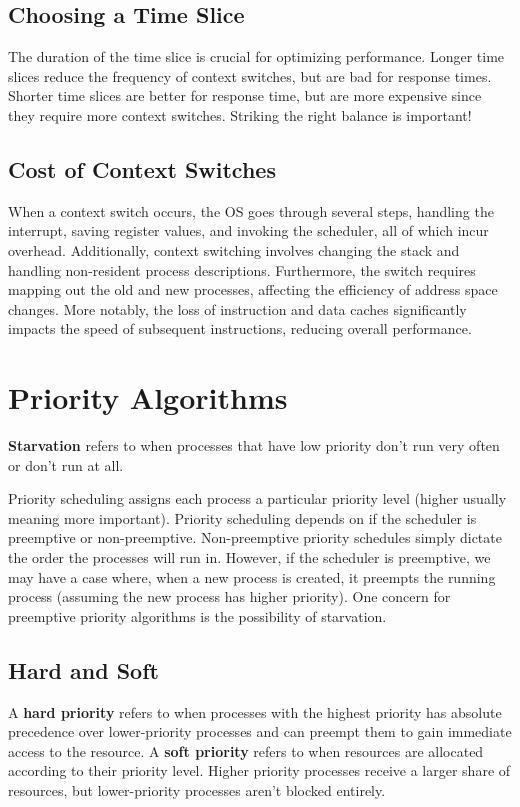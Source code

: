 \documentclass{report}
\newcommand{\definitionBegin}[1]{\begin{tcolorbox}[title={Definition: #1}]}
\newcommand{\definitionEnd}{\end{tcolorbox}}
\begin{document}
\subsection{Choosing a Time Slice}
The duration of the time slice is crucial for optimizing performance. Longer time slices reduce the
frequency of context switches, but are bad for response times. Shorter time slices are better for
response time, but are more expensive since they require more context switches. Striking the right
balance is important!


\subsection{Cost of Context Switches}
When a context switch occurs, the OS goes through several steps, handling the interrupt, saving
register values, and invoking the scheduler, all of which incur overhead. Additionally, context
switching involves changing the stack and handling non-resident process descriptions. Furthermore,
the switch requires mapping out the old and new processes, affecting the efficiency of address space
changes. More notably, the loss of instruction and data caches significantly impacts the speed of
subsequent instructions, reducing overall performance.





\section{Priority Algorithms}
\definitionBegin{Starvation}
\textbf{Starvation} refers to when processes that have low priority don't run very often or don't
run at all.
\definitionEnd

Priority scheduling assigns each process a particular priority level (higher usually meaning more
important). Priority scheduling depends on if the scheduler is preemptive or
non-preemptive. Non-preemptive priority schedules simply dictate the order the processes will run
in. However, if the scheduler is preemptive, we may have a case where, when a new process is
created, it preempts the running process (assuming the new process has higher priority). One concern
for preemptive priority algorithms is the possibility of starvation.


\subsection{Hard and Soft}
\definitionBegin{Hard and Soft Priorities}
A \textbf{hard priority} refers to when processes with the highest priority has absolute precedence
over lower-priority processes and can preempt them to gain immediate access to the resource.
\tcblower
A \textbf{soft priority} refers to when resources are allocated according to their priority
level. Higher priority processes receive a larger share of resources, but lower-priority
processes aren't blocked entirely.
\definitionEnd
\end{document}
